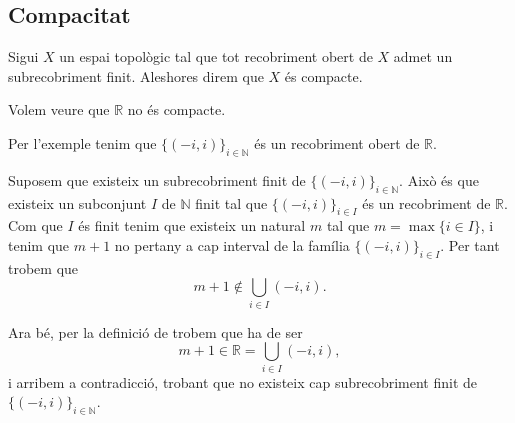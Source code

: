 \documentclass[../Apunts.tex]{subfiles}
\begin{document}
	\subsection{Compacitat}
	\begin{definition}[Compacte]
		\label{def:espai topològic compacte}
		Sigui \(X\) un espai topològic tal que tot recobriment obert de \(X\) admet un subrecobriment finit. Aleshores direm que \(X\) és compacte.
	\end{definition}
	\begin{example}
		\label{ex:R no és compacte}
		Volem veure que \(\mathbb{R}\) no és compacte.
		\begin{solution}
			Per l'exemple  tenim que \(\{(-i,i)\}_{i\in\mathbb{N}}\) és un recobriment obert de \(\mathbb{R}\).
			
			Suposem que existeix un subrecobriment finit de \(\{(-i,i)\}_{i\in\mathbb{N}}\). Això és que existeix un subconjunt \(I\) de \(\mathbb{N}\) finit tal que \(\{(-i,i)\}_{i\in I}\) és un recobriment de \(\mathbb{R}\). Com que \(I\) és finit tenim que existeix un natural \(m\) tal que \(m=\max\{i\in I\}\), i tenim que \(m+1\) no pertany a cap interval de la família \(\{(-i,i)\}_{i\in I}\). Per tant trobem que
			\[m+1\notin\bigcup_{i\in I}(-i,i).\]
			
			Ara bé, per la definició de  trobem que ha de ser
			\[m+1\in\mathbb{R}=\bigcup_{i\in I}(-i,i),\]
			i arribem a contradicció, trobant que no existeix cap subrecobriment finit de \(\{(-i,i)\}_{i\in\mathbb{N}}\).
		\end{solution}
	\end{example}
\end{document}
